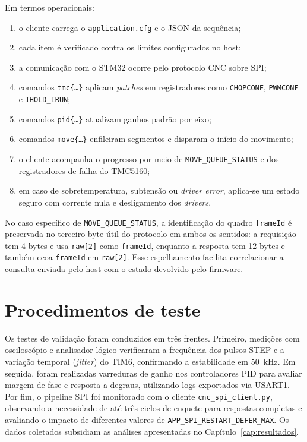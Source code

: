 \noindent Em termos operacionais:
\begin{enumerate}
\item o cliente carrega o \texttt{application.cfg} e o JSON da sequ\^encia;
\item cada item \'e verificado contra os limites configurados no host;
\item a comunica\c{c}\~ao com o STM32 ocorre pelo protocolo CNC sobre SPI;
\item comandos \texttt{tmc\{\ldots\}} aplicam \emph{patches} em
  registradores como \texttt{CHOPCONF}, \texttt{PWMCONF} e
  \texttt{IHOLD\_IRUN};
\item comandos \texttt{pid\{\ldots\}} atualizam ganhos padr\~ao por eixo;
\item comandos \texttt{move\{\ldots\}} enfileiram segmentos e disparam o
  in\'icio do movimento;
\item o cliente acompanha o progresso por meio de
  \texttt{MOVE\_QUEUE\_STATUS} e dos registradores de falha do TMC5160;
\item em caso de sobretemperatura, subtens\~ao ou \emph{driver error},
  aplica-se um estado seguro com corrente nula e desligamento dos
  \emph{drivers}.
\end{enumerate}

\noindent No caso espec\'ifico de \texttt{MOVE\_QUEUE\_STATUS}, a
identifica\c{c}\~ao do quadro \texttt{frameId} \'e preservada no terceiro
byte \'util do protocolo em ambos os sentidos: a requisi\c{c}\~ao tem
4 bytes e usa \texttt{raw[2]} como \texttt{frameId}, enquanto a resposta
tem 12 bytes e tamb\'em ecoa \texttt{frameId} em \texttt{raw[2]}. Esse
espelhamento facilita correlacionar a consulta enviada pelo host com o
estado devolvido pelo firmware.

\section{Procedimentos de teste}

Os testes de validação foram conduzidos em três frentes. Primeiro,
medições com osciloscópio e analisador lógico verificaram a frequência
dos pulsos STEP e a variação temporal (\emph{jitter}) do TIM6, confirmando a estabilidade em
\SI{50}{\kilo\hertz}. Em seguida, foram realizadas varreduras de ganho
nos controladores PID para avaliar margem de fase e resposta a degraus,
utilizando logs exportados via USART1. Por fim, o pipeline SPI foi
monitorado com o cliente \texttt{cnc\_spi\_client.py}, observando a necessidade de
até três ciclos de enquete para respostas completas e avaliando o
impacto de diferentes valores de \texttt{APP\_SPI\_RESTART\_DEFER\_MAX}. Os dados
coletados subsidiam as análises apresentadas no
Capítulo~\ref{cap:resultados}.
